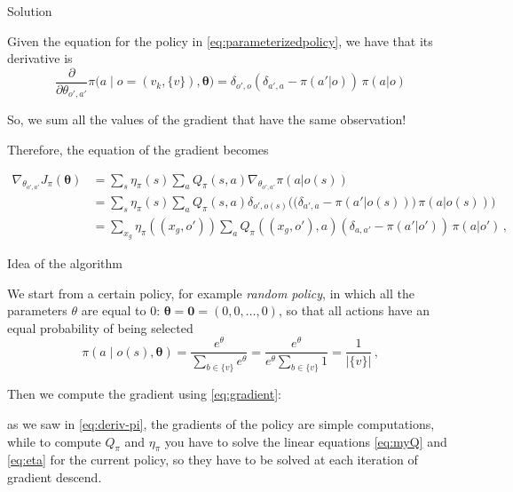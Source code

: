 \documentclass[10pt, aspectratio=169, compress, protectframetitle, handout]{beamer}
\begin{document}
\begin{frame}{Solution}
    
    Given the equation for the policy in {\color{blue}\eqref{eq:parameterizedpolicy}}, we have that its derivative is
    \begin{equation}
            \frac{\partial}{\partial \theta_{o',a'}} \pi \Big( a \;\big|\; o=(v_k, \{v\}), \boldsymbol \theta \Big) = \delta_{o',o} \left( \delta_{a',a} - \pi(a'|o) \right) \, \pi(a|o)
        \label{eq:deriv-pi}
    \end{equation}
    
    \alert{So, we sum all the values of the gradient that have the same observation!}
    
    Therefore, the equation of the gradient becomes
    
    \begin{equation}
        \begin{aligned}
            \nabla_{\theta_{o',a'}} J_\pi (\boldsymbol \theta)
            &= \sum_s \eta_\pi(s) \sum_a Q_\pi(s,a) \nabla_{\theta_{o',a'}} \pi(a|o(s)) \\
            &= \sum_s \eta_\pi(s) \sum_a Q_\pi(s,a) \delta_{o',o(s)} \Big( \big( \delta_{a',a} - \pi(a'|o(s)) \big) \, \pi(a|o(s)) \Big) \\
            &= \sum_{x_g} \eta_\pi((x_g, o')) \sum_a Q_\pi((x_g, o'),a) \left( \delta_{a,a'} - \pi(a'|o') \right) \, \pi(a|o') \, ,
        \end{aligned}
        \label{eq:gradient}
    \end{equation}
    
\end{frame}

\begin{frame}{Idea of the algorithm}
    
    We start from a certain policy, for example \emph{random policy}, in which all the parameters $\theta$ are equal to $0$: $\boldsymbol \theta = \mathbf 0 = (0, 0, \ldots, 0)$, so that all actions have an equal probability of being selected
    \begin{equation}
        \pi \left( a \;\big|\; o(s), \boldsymbol \theta \right) = \frac{e^{\theta}}{\sum_{b \in \{v\}} e^{\theta}} = \frac{e^{\theta}}{e^{\theta} \sum_{b \in \{v\}} 1 } = \frac1{ |\{v\}| } \, ,
        \label{eq:rndpolicy}
    \end{equation}
    
    Then we compute the gradient using {\color{blue}\eqref{eq:gradient}}:
    
    as we saw in {\color{blue}\eqref{eq:deriv-pi}}, the gradients of the policy are simple computations, while to compute $Q_\pi$ and $\eta_\pi$ you have to solve the linear equations {\color{blue}\eqref{eq:myQ}} and {\color{blue}\eqref{eq:eta}} for the current policy, so they \alert{have to be solved at each iteration of gradient descend}.
    
\end{frame}
\end{document}
